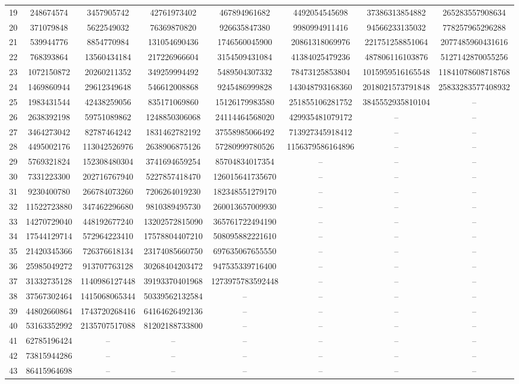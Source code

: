 \documentclass{amsart}
\numberwithin{equation}{section}
\begin{document}
{\begin{longtable}{|>{\columncolor{lightgray}}c|*{7}{c|}}
19 & 248674574 & 3457905742 & 42761973402 & 467894961682 & 4492054545698 & 37386313854882 & 265283557908634 \\
20 & 371079848 & 5622549032 & 76369870820 & 926635847380 & 9980994911416 & 94566233135032 & 778257965296288 \\
21 & 539944776 & 8854770984 & 131054690436 & 1746560045900 & 20861318069976 &  221751258851064 &  2077485960431616 \\
22 & 768393864 &  13560434184 & 217226966604 & 3154509431084 &41384025479236 &  487806116103876& 5127142870055256 \\
23 & 1072150872 & 20260211352 & 349259994492 & 5489504307332 & 78473125853804 & 1015959516165548 & 11841078608718768 \\
24 & 1469860944 & 29612349648 & 546612008868 & 9245486999828 & 143048793168360 & 2018021573791848 & 25833283577408932 \\
25 & 1983431544 & 42438259056 & 835171069860 & 15126179983580 & 251855106281752 & 3845552935810104 & -- \\
26 & 2638392198 & 59751089862 & 1248850306068 & 24114464568020 & 429935481079172 & -- & -- \\
27 & 3464273042 & 82787464242 & 1831462782192 & 37558985066492 & 713927345918412 & -- & -- \\
28 & 4495002176 & 113042526976 & 2638906875126 & 57280999780526 &1156379586164896 & -- & -- \\
29 & 5769321824 & 152308480304 & 3741694659254 &85704834017354 & -- & -- & -- \\
30 & 7331223300 & 202716767940 & 5227857418470 & 126015641735670 & -- & -- & -- \\
31 & 9230400780 & 266784073260 & 7206264019230 & 182348551279170 & -- & -- & -- \\
32 & 11522723880 & 347462296680 & 9810389495730 & 260013657009930 & -- & -- & -- \\
33 & 14270729040 & 448192677240 & 13202572815090 & 365761722494190 & -- & -- & -- \\
34 & 17544129714 & 572964223410 & 17578804407210 &508095882221610 & -- & -- & -- \\
35 & 21420345366 & 726376618134 & 23174085660750 & 697635067655550 & -- & -- & -- \\
36 & 25985049272 & 913707763128 & 30268404203472 &947535339716400 & -- & -- & -- \\
37 & 31332735128 & 1140986127448 & 39193370401968 & 1273975783592448 & -- & -- & -- \\
38 & 37567302464 & 1415068065344 & 50339562132584 & -- & -- & -- & -- \\
39 & 44802660864 & 1743720268416 & 64164626492136 & -- & -- & -- & -- \\
40 & 53163352992 & 2135707517088 & 81202188733800 & -- & -- & -- & -- \\
41 & 62785196424 &--  & -- & -- & -- & -- & -- \\
42 & 73815944286 & -- & -- & -- & -- & -- & -- \\
43 & 86415964698 & -- & -- & -- & -- & -- & -- \\
\hline

\end{longtable}}
\end{document}
